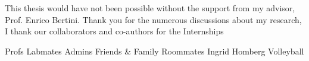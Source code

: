 This thesis would have not been possible without the support from my advisor, Prof. Enrico Bertini. Thank you for the numerous discussions about my research, 
I thank our collaborators and co-authors for the 
Internships

Profs
Labmates
Admins
Friends \& Family
Roommates
Ingrid Homberg
Volleyball

\noindent
{}
\makebox[\textwidth]{\hfill\makebox[3in]{\hfill\graddate\hfill}}

